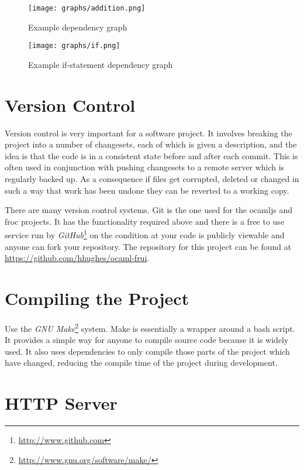 \begin{figure}
  \centering
  \texttt{[image: graphs/addition.png]}
  \caption{Example dependency graph}
  \label{add_graph}
\end{figure}

\begin{figure}
  \centering
  \texttt{[image: graphs/if.png]}
  \caption{Example if-statement dependency graph}
  \label{if_graph}
\end{figure}

\section{Version Control}

Version control is very important for a software project. It involves breaking the project into a number of changesets, each of which is given a description, and the idea is that the code is in a consistent state before and after each commit. This is often used in conjunction with pushing changesets to a remote server which is regularly backed up. As a consequence if files get corrupted, deleted or changed in such a way that work has been undone they can be reverted to a working copy.

There are many version control systems. Git is the one used for the ocamljs and froc projects. It has the functionality required above and there is a free to use service run by \emph{GitHub}\footnote{\url{http://www.github.com}} on the condition at your code is publicly viewable and anyone can fork your repository. The repository for this project can be found at \url{https://github.com/hhughes/ocaml-frui}.

\section{Compiling the Project}

Use the \emph{GNU Make}\footnote{\url{http://www.gnu.org/software/make/}} system. Make is essentially a wrapper around a bash script. It provides a simple way for anyone to compile source code because it is widely used. It also uses dependencies to only compile those parts of the project which have changed, reducing the compile time of the project during development.

\section{HTTP Server}


